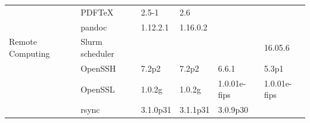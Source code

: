 \begin{table}[!ht]
{\begin{tabular}{|ll|l|l|l|l|}
\rowcolor{black!5}
\cellcolor{white}                                                      & \multicolumn{1}{|l|}{PDF\TeX}                & 2.5-1                                                               & 2.6                                                               &                                                                        &                                                \\
\rowcolor{black!10}
\cellcolor{white}                                                      & \multicolumn{1}{|l|}{pandoc}                 & 1.12.2.1                                                            & 1.16.0.2                                                          &                                                                        &                                                \\
\hline
\rowcolor{black!5}
\cellcolor{white} Remote Computing                                     & \multicolumn{1}{|l|}{Slurm scheduler}        &                                                                     &                                                                   &                                                                        & 16.05.6                                        \\
\rowcolor{black!10}
\cellcolor{white}                                                      & \multicolumn{1}{|l|}{OpenSSH}                & 7.2p2                                                               & 7.2p2                                                             & 6.6.1                                                                  & 5.3p1                                          \\
\rowcolor{black!5}
\cellcolor{white}                                                      & \multicolumn{1}{|l|}{OpenSSL}                & 1.0.2g                                                              & 1.0.2g                                                            & 1.0.01e-fips                                                           & 1.0.01e-fips                                   \\
\rowcolor{black!10}
\cellcolor{white}                                                      & \multicolumn{1}{|l|}{rsync}                  & 3.1.0p31                                                            & 3.1.1p31                                                          & 3.0.9p30                                                               &                                                \\

\end{tabular}}
\end{table}
